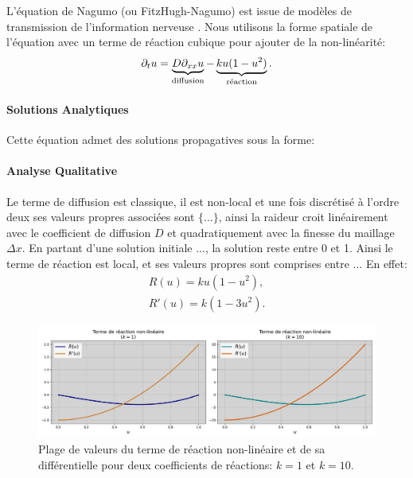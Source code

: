 L'équation de Nagumo (ou FitzHugh-Nagumo) est issue de modèles de transmission de l'information nerveuse \cite{FITZHUGH1961445}.
Nous utilisons la forme spatiale de l'équation \cite{keener1998mathematical} avec un terme de réaction cubique pour ajouter de la non-linéarité:
\begin{align}
    \partial_t u = \underbrace{D \partial_{xx} u}_{\text{diffusion}}
            - \underbrace{ku(1-u^2)}_{\text{réaction}}.
\end{align}
\paragraph{Solutions Analytiques}
Cette équation admet des solutions propagatives sous la forme:
\paragraph{Analyse Qualitative}
Le terme de diffusion est classique, il est non-local et une fois discrétisé à l'ordre deux ses valeurs propres associées sont 
$\{ ... \}$, ainsi la raideur croit linéairement avec le coefficient de diffusion $D$ et quadratiquement avec la finesse du maillage $\Delta x$.
En partant d'une solution initiale ..., 
la solution reste entre 0 et 1. Ainsi le terme de réaction est local, et ses valeurs propres sont comprises entre ...
En effet: 
\begin{align}
    R(u) = ku(1-u^2),\\
    R'(u) = k (1 - 3u^2).
\end{align}

\begin{figure}[htbp]
    \centering
    \includegraphics[width=\textwidth]{media/4_travail/2_nagumo/raideur_reaction_nagumo.pdf}
    \caption{Plage de valeurs du terme de réaction non-linéaire et de sa différentielle pour deux coefficients de réactions: $k=1$ et $k=10$.}
    \label{fig:raideur_reaction_nagumo}
\end{figure}